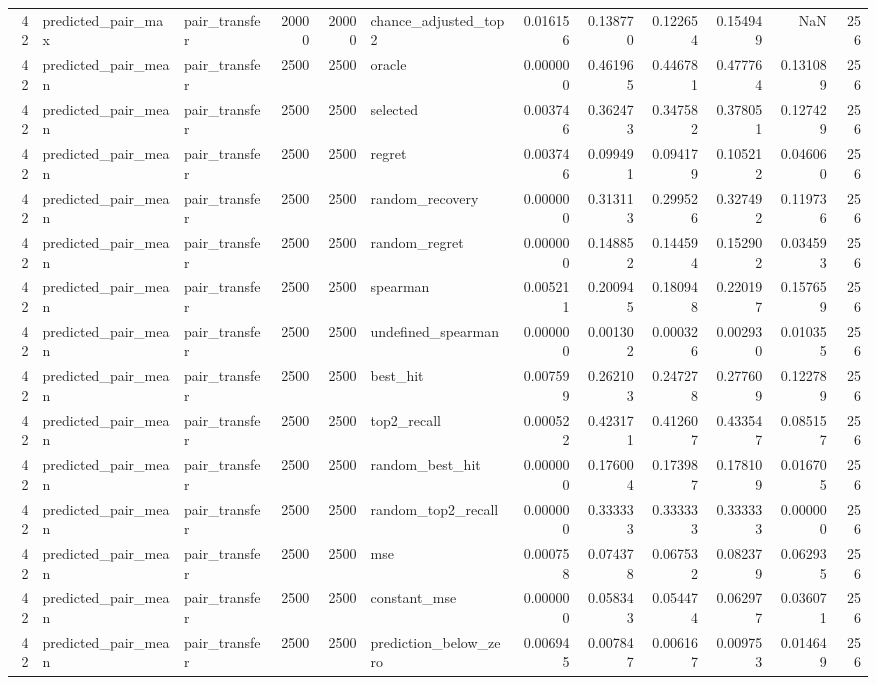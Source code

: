 \begin{tabular}{rllrrlrrrrrr}
42 & predicted_pair_max & pair_transfer & 20000 & 20000 & chance_adjusted_top2 & 0.016156 & 0.138770 & 0.122654 & 0.154949 & NaN & 256 \\
42 & predicted_pair_mean & pair_transfer & 2500 & 2500 & oracle & 0.000000 & 0.461965 & 0.446781 & 0.477764 & 0.131089 & 256 \\
42 & predicted_pair_mean & pair_transfer & 2500 & 2500 & selected & 0.003746 & 0.362473 & 0.347582 & 0.378051 & 0.127429 & 256 \\
42 & predicted_pair_mean & pair_transfer & 2500 & 2500 & regret & 0.003746 & 0.099491 & 0.094179 & 0.105212 & 0.046060 & 256 \\
42 & predicted_pair_mean & pair_transfer & 2500 & 2500 & random_recovery & 0.000000 & 0.313113 & 0.299526 & 0.327492 & 0.119736 & 256 \\
42 & predicted_pair_mean & pair_transfer & 2500 & 2500 & random_regret & 0.000000 & 0.148852 & 0.144594 & 0.152902 & 0.034593 & 256 \\
42 & predicted_pair_mean & pair_transfer & 2500 & 2500 & spearman & 0.005211 & 0.200945 & 0.180948 & 0.220197 & 0.157659 & 256 \\
42 & predicted_pair_mean & pair_transfer & 2500 & 2500 & undefined_spearman & 0.000000 & 0.001302 & 0.000326 & 0.002930 & 0.010355 & 256 \\
42 & predicted_pair_mean & pair_transfer & 2500 & 2500 & best_hit & 0.007599 & 0.262103 & 0.247278 & 0.277609 & 0.122789 & 256 \\
42 & predicted_pair_mean & pair_transfer & 2500 & 2500 & top2_recall & 0.000522 & 0.423171 & 0.412607 & 0.433547 & 0.085157 & 256 \\
42 & predicted_pair_mean & pair_transfer & 2500 & 2500 & random_best_hit & 0.000000 & 0.176004 & 0.173987 & 0.178109 & 0.016705 & 256 \\
42 & predicted_pair_mean & pair_transfer & 2500 & 2500 & random_top2_recall & 0.000000 & 0.333333 & 0.333333 & 0.333333 & 0.000000 & 256 \\
42 & predicted_pair_mean & pair_transfer & 2500 & 2500 & mse & 0.000758 & 0.074378 & 0.067532 & 0.082379 & 0.062935 & 256 \\
42 & predicted_pair_mean & pair_transfer & 2500 & 2500 & constant_mse & 0.000000 & 0.058343 & 0.054474 & 0.062977 & 0.036071 & 256 \\
42 & predicted_pair_mean & pair_transfer & 2500 & 2500 & prediction_below_zero & 0.006945 & 0.007847 & 0.006167 & 0.009753 & 0.014649 & 256 \\

\end{tabular}
